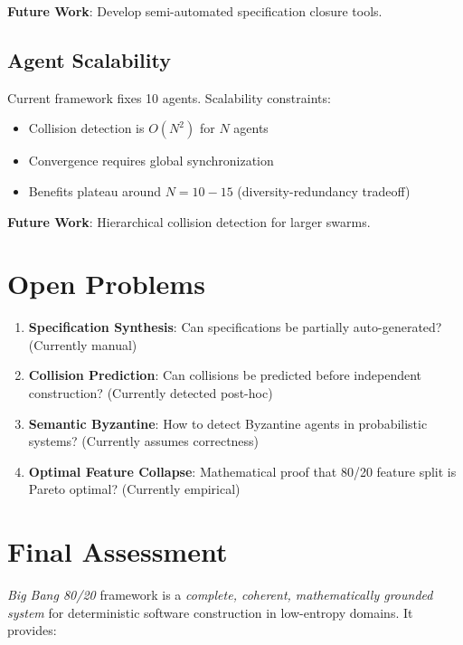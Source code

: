 \documentclass[12pt,oneside,a4paper]{book}
\newcommand{\BB}{\textit{Big Bang 80/20}\xspace}
\theoremstyle{definition}
\begin{document}
\textbf{Future Work}: Develop semi-automated specification closure tools.

\subsection{Agent Scalability}

Current framework fixes 10 agents. Scalability constraints:
\begin{itemize}
  \item Collision detection is $O(N^2)$ for $N$ agents
  \item Convergence requires global synchronization
  \item Benefits plateau around $N=10-15$ (diversity-redundancy tradeoff)
\end{itemize}

\textbf{Future Work}: Hierarchical collision detection for larger swarms.

\section{Open Problems}
\label{sec:conclusions-open}

\begin{enumerate}
  \item \textbf{Specification Synthesis}: Can specifications be partially auto-generated? (Currently manual)

  \item \textbf{Collision Prediction}: Can collisions be predicted before independent construction? (Currently detected post-hoc)

  \item \textbf{Semantic Byzantine}: How to detect Byzantine agents in probabilistic systems? (Currently assumes correctness)

  \item \textbf{Optimal Feature Collapse}: Mathematical proof that 80/20 feature split is Pareto optimal? (Currently empirical)
\end{enumerate}

\section{Final Assessment}
\label{sec:conclusions-assessment}

\BB framework is a \emph{complete, coherent, mathematically grounded system} for deterministic software construction in low-entropy domains. It provides:
\end{document}
